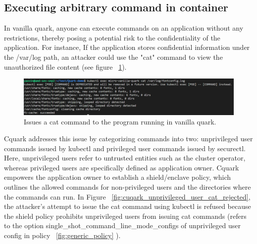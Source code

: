 \subsection{Executing arbitrary command in container}
In vanilla quark, anyone can execute commands on an application without any restrictions, thereby posing a potential risk to the confidentiality of the application.  For instance, If the application stores confidential information under the /var/log path, an attacker could use the "cat" 
command to view the unauthorized file content (see figure ~\ref{fig:vanila_execute_cat_cmd}).


\begin{figure}[H]
    \centering
    \includegraphics[width=1\textwidth]{images/vanila_execute_cat_cmd.png}
    \caption[Issues a cat command to the program running in vanilla quark]{Issues a cat command to the program running in vanilla quark.}
    \label{fig:vanila_execute_cat_cmd}
\end{figure}


Cquark addresses this issue by categorizing commands into two: unprivileged user commands issued by kubectl and privileged user commands issued by securectl. Here, unprivileged users refer to untrusted entities such as the cluster operator, 
whereas privileged users are specifically defined as application owner. Cquark empowers the application owner to establish a shield/enclave policy, which outlines the allowed commands for non-privileged users and the directories where the commands can run. 
In Figure ~\ref{fig:cuqark_unprivileged_user_cat_rejected}, the attacker's attempt to issue the cat command using kubectl is refused because the shield policy prohibits unprivileged users from issuing cat commands (refers to the option single\_shot\_command\_line\_mode\_configs of 
unprivileged user config in policy ~\ref{fig:generic_policy} ).


